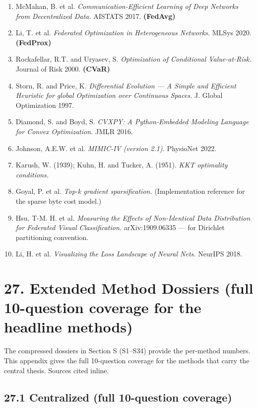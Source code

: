\documentclass{article}
\begin{document}
\begin{enumerate}[leftmargin=1.4em,itemsep=2pt,topsep=2pt]
  \item McMahan, B. et al. \emph{Communication-Efficient Learning of Deep Networks from Decentralized Data.} AISTATS 2017. \textbf{(FedAvg)}
  \item Li, T. et al. \emph{Federated Optimization in Heterogeneous Networks.} MLSys 2020. \textbf{(FedProx)}
  \item Rockafellar, R.T. and Uryasev, S. \emph{Optimization of Conditional Value-at-Risk.} Journal of Risk 2000. \textbf{(CVaR)}
  \item Storn, R. and Price, K. \emph{Differential Evolution --- A Simple and Efficient Heuristic for global Optimization over Continuous Spaces.} J. Global Optimization 1997.
  \item Diamond, S. and Boyd, S. \emph{CVXPY: A Python-Embedded Modeling Language for Convex Optimization.} JMLR 2016.
  \item Johnson, A.E.W. et al. \emph{MIMIC-IV (version 2.1).} PhysioNet 2022.
  \item Karush, W. (1939); Kuhn, H. and Tucker, A. (1951). \emph{KKT optimality conditions.}
  \item Goyal, P. et al. \emph{Top-k gradient sparsification.} (Implementation reference for the sparse byte cost model.)
  \item Hsu, T-M. H. et al. \emph{Measuring the Effects of Non-Identical Data Distribution for Federated Visual Classification.} arXiv:1909.06335 --- for Dirichlet partitioning convention.
  \item Li, H. et al. \emph{Visualizing the Loss Landscape of Neural Nets.} NeurIPS 2018.
\end{enumerate}




\clearpage
\section{27. Extended Method Dossiers (full 10-question coverage for the headline methods)}


The compressed dossiers in Section S (S1--S34) provide the per-method numbers. This appendix gives the full 10-question coverage for the methods that carry the central thesis. Sources cited inline.


\subsection{27.1 Centralized (full 10-question coverage)}
\end{document}
